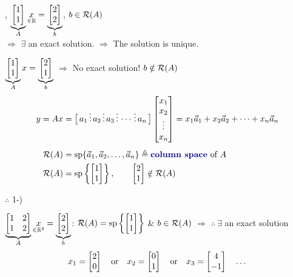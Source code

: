 \sep
\point $\displaystyle \underbrace{\begin{bmatrix}1\\1\end{bmatrix}}_{A}\underset{\in\mathbb{R}}{x} = \underbrace{\begin{bmatrix}2\\2\end{bmatrix}}_{b}$,
\qquad $b\in\mathcal{R}(A)$\\[4pt]
$\Rightarrow$ $\exists$ an exact solution. \quad $\Rightarrow$ The solution is unique.

\point $\displaystyle \underbrace{\begin{bmatrix}1\\1\end{bmatrix}}_{A}x = \underbrace{\begin{bmatrix}2\\1\end{bmatrix}}_{b}$
\quad $\Rightarrow$ No exact solution! \qquad $b\notin\mathcal{R}(A)$
\begin{align*}
y = Ax &= \big[\,a_1 \,\vdots\, a_2 \,\vdots\, a_3 \,\vdots\, \cdots \,\vdots\, a_n\,\big]\bmat{x_1\\x_2\\ \vdots\\ x_n}
= x_1\vec a_1 + x_2\vec a_2 + \dots + x_n\vec a_n\\[4pt]
\Range(A) &= \Span\{\vec a_1,\vec a_2,\dots,\vec a_n\} \triangleq \text{\term{column space} of } A\\
\Range(A) &= \Span\left\{\bmat{1\\1}\right\}, \qquad \bmat{2\\1}\notin\Range(A)
\end{align*}

\begin{keybox}
$\therefore$ 1-) 
\end{keybox}

\point $\displaystyle \underbrace{\begin{bmatrix}1&2\\1&2\end{bmatrix}}_{A}\underset{\in\mathbb{R}^2}{x} = \underbrace{\begin{bmatrix}2\\2\end{bmatrix}}_{b}$:
\quad $\mathcal{R}(A) = \operatorname{sp}\left\{\begin{bmatrix}1\\1\end{bmatrix}\right\}$ \& $b\in\mathcal{R}(A)$ $\Rightarrow$ $\therefore\ \exists$ an exact solution
\[
x_1 = \begin{bmatrix}2\\0\end{bmatrix} \quad\text{or}\quad x_2 = \begin{bmatrix}0\\1\end{bmatrix} \quad\text{or}\quad x_3 = \begin{bmatrix}4\\-1\end{bmatrix} \quad\dots
\]

